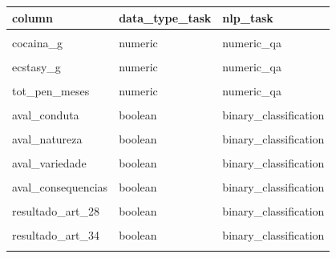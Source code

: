 \documentclass[
  12pt,
]{article}
\begin{document}
\begin{longtable}[t]{>{\raggedright\arraybackslash}p{15em}>{\raggedright\arraybackslash}p{17em}>{\raggedright\arraybackslash}p{17em}}

\toprule
column & data\_type\_task & nlp\_task\\
\midrule
\cellcolor{gray!10}{maconha\_g} & \cellcolor{gray!10}{numeric} & \cellcolor{gray!10}{numeric\_qa}\\
cocaina\_g & numeric & numeric\_qa\\
\cellcolor{gray!10}{crack\_g} & \cellcolor{gray!10}{numeric} & \cellcolor{gray!10}{numeric\_qa}\\
ecstasy\_g & numeric & numeric\_qa\\
\cellcolor{gray!10}{lsd\_g} & \cellcolor{gray!10}{numeric} & \cellcolor{gray!10}{numeric\_qa}\\
\addlinespace
tot\_pen\_meses & numeric & numeric\_qa\\
\cellcolor{gray!10}{aval\_antecedentes} & \cellcolor{gray!10}{boolean} & \cellcolor{gray!10}{binary\_classification}\\
aval\_conduta & boolean & binary\_classification\\
\cellcolor{gray!10}{aval\_personalidade} & \cellcolor{gray!10}{boolean} & \cellcolor{gray!10}{binary\_classification}\\
aval\_natureza & boolean & binary\_classification\\
\addlinespace
\cellcolor{gray!10}{aval\_quantidade} & \cellcolor{gray!10}{boolean} & \cellcolor{gray!10}{binary\_classification}\\
aval\_variedade & boolean & binary\_classification\\
\cellcolor{gray!10}{aval\_circunstancias} & \cellcolor{gray!10}{boolean} & \cellcolor{gray!10}{binary\_classification}\\
aval\_consequencias & boolean & binary\_classification\\
\cellcolor{gray!10}{aval\_culpabilidade} & \cellcolor{gray!10}{boolean} & \cellcolor{gray!10}{binary\_classification}\\
\addlinespace
resultado\_art\_28 & boolean & binary\_classification\\
\cellcolor{gray!10}{resultado\_art\_33} & \cellcolor{gray!10}{boolean} & \cellcolor{gray!10}{binary\_classification}\\
resultado\_art\_34 & boolean & binary\_classification\\
\cellcolor{gray!10}{resultado\_art\_35} & \cellcolor{gray!10}{boolean} & \cellcolor{gray!10}{binary\_classification}\\

\end{longtable}
\end{document}
